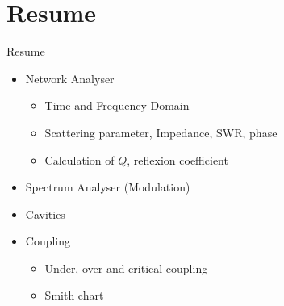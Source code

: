 \documentclass{beamer}
\begin{document}
\section{Resume}
\begin{frame}[t,fragile]{Resume}
\begin{itemize}
\item Network Analyser
\begin{itemize}
\item Time and Frequency Domain
\item Scattering parameter, Impedance, SWR, phase
\item Calculation of $Q$, reflexion coefficient
\end{itemize}
\item Spectrum Analyser (Modulation)

\item Cavities
\item Coupling
\begin{itemize}
\item Under, over and critical coupling  
\item Smith chart
\end{itemize}
\end{itemize}
\begin{figure}
  \centering
  \quad
\end{figure}
\end{frame}
\end{document}
